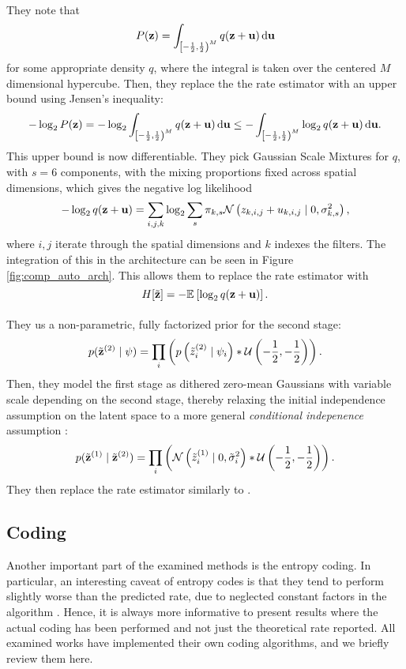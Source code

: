 \paragraph{\cite{theis2017lossy}} They note that
  \[
    P(\mathbf{z}) = \int_{\left[-\frac{1}{2}, \frac{1}{2}\right)^M} q(\mathbf{z} + \mathbf{u}) \,\text{d} \mathbf{u}
  \]
  for some appropriate density $q$,
  where the integral is taken over the centered $M$ dimensional hypercube.
  Then, they replace the the rate estimator with an upper bound using Jensen's
  inequality:
  \[
    -\log_2P(\mathbf{z}) = -\log_2\int_{\left[-\frac{1}{2}, \frac{1}{2}\right)^M} q(\mathbf{z} +
    \mathbf{u}) \,\text{d} \mathbf{u} \leq -\int_{\left[-\frac{1}{2}, \frac{1}{2}\right)^M} \log_2q(\mathbf{z} +
    \mathbf{u}) \,\text{d} \mathbf{u}.
  \]
  This upper bound is now differentiable. They pick Gaussian Scale Mixtures for
  $q$, with $s = 6$ components, with the mixing proportions fixed across spatial
  dimensions, which gives the negative log likelihood
  \[
    -\log_2 q(\mathbf{z} + \mathbf{u}) =
    \sum_{i, j, k} \log_2 \sum_s \pi_{k, s} \mathcal{N}\left( z_{k,i,j} + u_{k, i, j} \mid
    0, \sigma_{k, s}^2 \right),
  \]
  where $i,j$ iterate through the spatial dimensions and $k$ indexes the
  filters. The integration of this in the architecture can be seen in Figure
  \ref{fig:comp_auto_arch}.  This allows them to replace the rate estimator with
  \[
    H[\tilde{\mathbf{z}}] = -\mathbb{E}_{}\left[ \log_2 q(\mathbf{z} + \mathbf{u}) \right].
  \]

  \paragraph{\cite{balle2018variational}} They us a non-parametric,
  fully factorized prior for the second stage:
  \[
    p(\tilde{\mathbf{z}}^{(2)} \mid \psi) =
    \prod_i \left(  p\left(\tilde{z}^{(2)}_i \mid \psi_i\right) *
      \mathcal{U}\left( -\frac{1}{2}, -\frac{1}{2}\right) \right).
  \]
  Then, they model the first stage as dithered zero-mean Gaussians with variable
  scale depending on the second stage, thereby relaxing the initial independence
  assumption on the latent space to a more general \textit{conditional
    indepenence} assumption \cite{bishop1998latent}:
  \[
    p(\tilde{\mathbf{z}}^{(1)} \mid \tilde{\mathbf{z}}^{(2)}) = 
    \prod_i \left(  \mathcal{N}\left( \tilde{z}^{(1)}_i \mid 0, \tilde{\sigma}^2_i\right)*
      \mathcal{U}\left( -\frac{1}{2}, -\frac{1}{2} \right) \right).
  \]
  They then replace the rate estimator similarly to \cite{balle2016end}.

\subsection{Coding}
\par
Another important part of the examined methods is the entropy coding. In particular, an
interesting caveat of entropy codes is that they tend to perform slightly worse
than the predicted rate, due to neglected constant factors in the algorithm
\cite{rissanen1981universal}. Hence, it is always more informative to present
results where the actual coding has been performed and not just the theoretical
rate reported. All examined works have implemented their own coding algorithms,
and we briefly review them here. 


